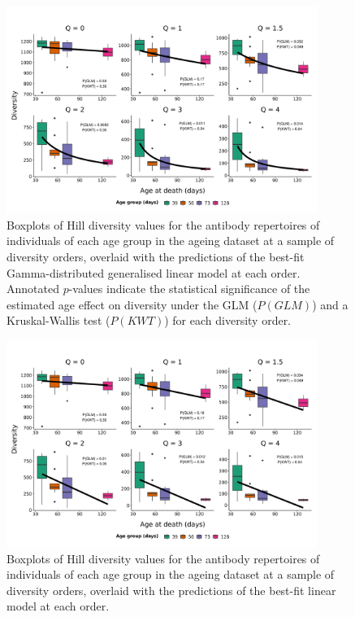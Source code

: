 \begin{figure}
\centering
\includegraphics[width = 0.9\textwidth]{_Figures/png/ageing-clone-diversity-solo-fit-gamma}
\caption{Boxplots of Hill diversity values for the antibody repertoires of individuals of each age group in the \igseq ageing dataset at a sample of diversity orders, overlaid with the predictions of the best-fit Gamma-distributed generalised linear model at each order.  Annotated $p$-values indicate the statistical significance of the estimated age effect on diversity under the GLM ($P(GLM)$) and a Kruskal-Wallis test ($P(KWT)$) for each diversity order.}
\label{fig:igseq-ageing-clone-diversity-solo-fit-gamma}
\end{figure}

\begin{figure}
\centering
\includegraphics[width = 0.9\textwidth]{_Figures/png/ageing-clone-diversity-solo-fit-linear}
\caption{Boxplots of Hill diversity values for the antibody repertoires of individuals of each age group in the \igseq ageing dataset at a sample of diversity orders, overlaid with the predictions of the best-fit linear model at each order.}
\label{fig:igseq-ageing-clone-diversity-solo-fit-linear}
\end{figure}


